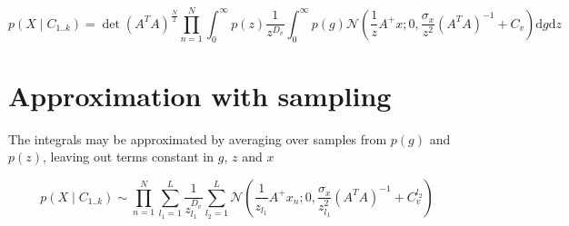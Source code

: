 \documentclass{paper}
\begin{document}
\begin{equation}
p(X \mid C_{1..k}) =  \det(A^T A)^{\frac{N}{2}} \prod_{n=1}^N \int_{0}^{\infty} p(z) \frac{1}{z^{D_v}}  \int_{0}^{\infty}  p(g) \mathcal{N}(\frac{1}{z} A^{+}x; 0,\frac{\sigma_x}{z^2} (A^T A)^{-1} + C_v) \mathrm{d}g \mathrm{d}z
\end{equation}

\section{Approximation with sampling}

The integrals may be approximated by averaging over samples from $p(g)$ and $p(z)$, leaving out terms constant in $g$, $z$ and $x$

\begin{equation}
p(X \mid C_{1..k}) \sim \prod_{n=1}^N  \sum_{l_1=1}^L \frac{1}{z_{l_1}^{D_v}}  \sum_{l_2=1}^L \mathcal{N}(\frac{1}{z_{l_1}} A^{+}x_n; 0,\frac{\sigma_x}{z_{l_1}^2} (A^T A)^{-1} + C_v^{l_2})
\end{equation}
\end{document}
